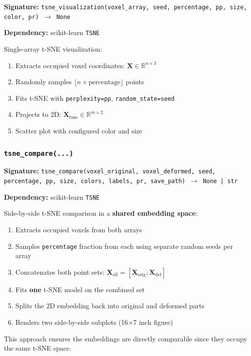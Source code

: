 \documentclass[12pt,a4paper]{article}
\begin{document}
\textbf{Signature:} \texttt{tsne\_visualization(voxel\_array, seed, percentage, pp, size, color, pr) $\rightarrow$ None}

\textbf{Dependency:} scikit-learn \texttt{TSNE}

Single-array t-SNE visualization:

\begin{enumerate}
  \item Extracts occupied voxel coordinates: $\mathbf{X} \in \mathbb{R}^{n \times 3}$
  \item Randomly samples $\lfloor n \times \text{percentage} \rfloor$ points
  \item Fits t-SNE with \texttt{perplexity=pp}, \texttt{random\_state=seed}
  \item Projects to 2D: $\mathbf{X}_{\text{tsne}} \in \mathbb{R}^{m \times 2}$
  \item Scatter plot with configured color and size
\end{enumerate}

\subsubsection{\texttt{tsne\_compare(...)}}

\textbf{Signature:} \texttt{tsne\_compare(voxel\_original, voxel\_deformed, seed, percentage, pp, size, colors, labels, pr, save\_path) $\rightarrow$ None | str}

\textbf{Dependency:} scikit-learn \texttt{TSNE}

Side-by-side t-SNE comparison in a \textbf{shared embedding space}:

\begin{enumerate}
  \item Extracts occupied voxels from both arrays
  \item Samples \texttt{percentage} fraction from each using separate random seeds per array
  \item Concatenates both point sets: $\mathbf{X}_{\text{all}} = [\mathbf{X}_{\text{orig}}; \mathbf{X}_{\text{def}}]$
  \item Fits \textbf{one} t-SNE model on the combined set
  \item Splits the 2D embedding back into original and deformed parts
  \item Renders two side-by-side subplots (16$\times$7 inch figure)
\end{enumerate}

This approach ensures the embeddings are directly comparable since they occupy the same t-SNE space.
\end{document}
